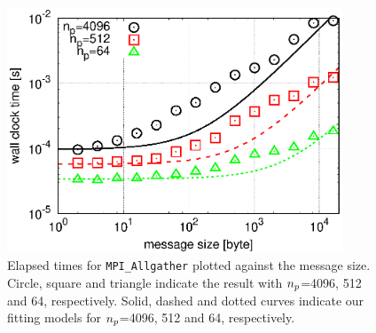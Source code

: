 \documentclass[dvipdfmx]{pasj01}
\begin{document}
\begin{figure}
    \begin{center}
      \includegraphics[width=10cm]{./fig/wtime_allgather.eps}
    \end{center}
  \caption{Elapsed times for {\tt MPI\_Allgather} plotted against the
    message size. Circle, square and triangle indicate the result with
    $n_{\rm p}$=4096, 512 and 64, respectively. Solid, dashed and
    dotted curves indicate our fitting models for $n_{\rm p}$=4096,
    512 and 64, respectively.}
  \label{fig:wtime_allgather}
\end{figure}
\end{document}
